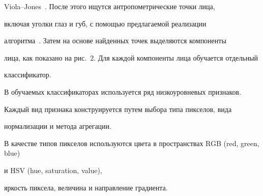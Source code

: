 Viola--Jones~\cite{19-k}. После этого ищутся антропометрические точки лица, 


включая уголки глаз и губ, с помощью предлагаемой реализации 


алгоритма~\cite{3-k}. Затем на основе найденных точек выделяются компоненты 


лица, как показано на рис.~2. Для каждой компоненты лица обучается отдельный 


классификатор. 





В обучаемых классификаторах используется ряд низкоуровневых признаков. 


Каждый вид признака конструируется путем выбора типа пикселов, вида 


нормализации и метода агрегации. 











В качестве типов пикселов используются цвета в пространствах RGB (red, green, blue)


и HSV (hue, saturation, value), 


яркость пиксела, величина и направление градиента.








\pagebreak





\





\vspace*{-12pt}










